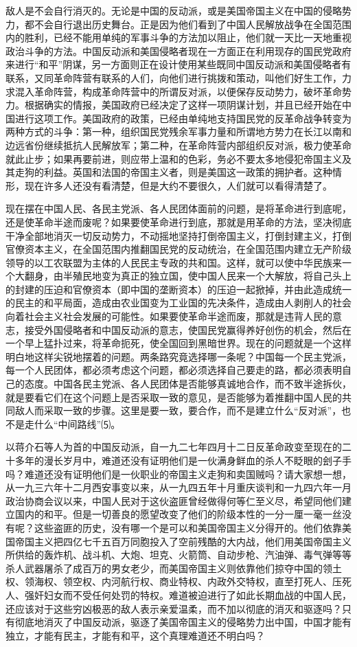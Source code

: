 \documentclass[UTF-8, a5paper, 12pt]{ctexart}
\begin{document}
敌人是不会自行消灭的。无论是中国的反动派，或是美国帝国主义在中国的侵略势力，都不会自行退出历史舞台。正是因为他们看到了中国人民解放战争在全国范围内的胜利，已经不能用单纯的军事斗争的方法加以阻止，他们就一天比一天地重视政治斗争的方法。中国反动派和美国侵略者现在一方面正在利用现存的国民党政府来进行“和平”阴谋，另一方面则正在设计使用某些既同中国反动派和美国侵略者有联系，又同革命阵营有联系的人们，向他们进行挑拨和策动，叫他们好生工作，力求混入革命阵营，构成革命阵营中的所谓反对派，以便保存反动势力，破坏革命势力。根据确实的情报，美国政府已经决定了这样一项阴谋计划，并且已经开始在中国进行这项工作。美国政府的政策，已经由单纯地支持国民党的反革命战争转变为两种方式的斗争：第一种，组织国民党残余军事力量和所谓地方势力在长江以南和边远省份继续抵抗人民解放军；第二种，在革命阵营内部组织反对派，极力使革命就此止步；如果再要前进，则应带上温和的色彩，务必不要太多地侵犯帝国主义及其走狗的利益。英国和法国的帝国主义者，则是美国这一政策的拥护者。这种情形，现在许多人还没有看清楚，但是大约不要很久，人们就可以看得清楚了。

现在摆在中国人民、各民主党派、各人民团体面前的问题，是将革命进行到底呢，还是使革命半途而废呢？如果要使革命进行到底，那就是用革命的方法，坚决彻底干净全部地消灭一切反动势力，不动摇地坚持打倒帝国主义，打倒封建主义，打倒官僚资本主义，在全国范围内推翻国民党的反动统治，在全国范围内建立无产阶级领导的以工农联盟为主体的人民民主专政的共和国。这样，就可以使中华民族来一个大翻身，由半殖民地变为真正的独立国，使中国人民来一个大解放，将自己头上的封建的压迫和官僚资本（即中国的垄断资本）的压迫一起掀掉，并由此造成统一的民主的和平局面，造成由农业国变为工业国的先决条件，造成由人剥削人的社会向着社会主义社会发展的可能性。如果要使革命半途而废，那就是违背人民的意志，接受外国侵略者和中国反动派的意志，使国民党赢得养好创伤的机会，然后在一个早上猛扑过来，将革命扼死，使全国回到黑暗世界。现在的问题就是一个这样明白地这样尖锐地摆着的问题。两条路究竟选择哪一条呢？中国每一个民主党派，每一个人民团体，都必须考虑这个问题，都必须选择自己要走的路，都必须表明自己的态度。中国各民主党派、各人民团体是否能够真诚地合作，而不致半途拆伙，就是要看它们在这个问题上是否采取一致的意见，是否能够为着推翻中国人民的共同敌人而采取一致的步骤。这里是要一致，要合作，而不是建立什么“反对派”，也不是走什么“中间路线”⑸。

以蒋介石等人为首的中国反动派，自一九二七年四月十二日反革命政变至现在的二十多年的漫长岁月中，难道还没有证明他们是一伙满身鲜血的杀人不眨眼的刽子手吗？难道还没有证明他们是一伙职业的帝国主义走狗和卖国贼吗？请大家想一想，从一九三六年十二月西安事变以来，从一九四五年十月重庆谈判和一九四六年一月政治协商会议以来，中国人民对于这伙盗匪曾经做得何等仁至义尽，希望同他们建立国内的和平。但是一切善良的愿望改变了他们的阶级本性的一分一厘一毫一丝没有呢？这些盗匪的历史，没有哪一个是可以和美国帝国主义分得开的。他们依靠美国帝国主义把四亿七千五百万同胞投入了空前残酷的大内战，他们用美国帝国主义所供给的轰炸机、战斗机、大炮、坦克、火箭筒、自动步枪、汽油弹、毒气弹等等杀人武器屠杀了成百万的男女老少，而美国帝国主义则依靠他们掠夺中国的领土权、领海权、领空权、内河航行权、商业特权、内政外交特权，直至打死人、压死人、强奸妇女而不受任何处罚的特权。难道被迫进行了如此长期血战的中国人民，还应该对于这些穷凶极恶的敌人表示亲爱温柔，而不加以彻底的消灭和驱逐吗？只有彻底地消灭了中国反动派，驱逐了美国帝国主义的侵略势力出中国，中国才能有独立，才能有民主，才能有和平，这个真理难道还不明白吗？
\end{document}
